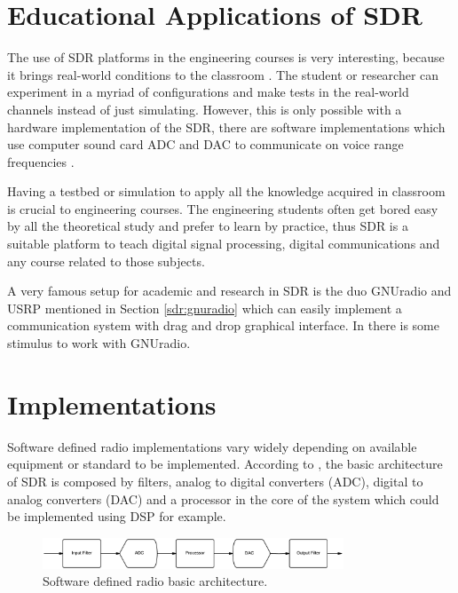 \section{Educational Applications of SDR}

The use of SDR platforms in the engineering courses is very interesting, because
it brings real-world conditions to the classroom \cite{ladimer2009}. The student
or researcher can experiment in a myriad of configurations and make tests in the
real-world channels instead of just simulating. However, this is only possible
with a hardware implementation of the SDR, there are software implementations
which use computer sound card ADC and DAC to communicate on voice range
frequencies \cite{ladimer2009}.

Having a testbed or simulation to apply all the knowledge acquired in classroom
is crucial to engineering courses. The engineering students often get bored easy
by all the theoretical study and prefer to learn by practice, thus SDR is a
suitable platform to teach digital signal processing, digital communications and
any course related to those subjects.

A very famous setup for academic and research in SDR is the duo GNUradio
\cite{web:gnuradio} and USRP \cite{web:usrp} mentioned in Section
\ref{sdr:gnuradio} which can easily implement a communication system with drag
and drop graphical interface. In \cite{akbook} there is some stimulus to work
with GNUradio.


\section{Implementations}
\label{sdr:implement}

Software defined radio implementations vary widely depending on available
equipment or standard to be implemented. According to \cite{ladimer2009}, the basic
architecture of SDR is composed by filters, analog to digital converters (ADC),
digital to analog converters (DAC) and a processor in the core of the system
which could be implemented using DSP for example.

\begin{figure}[htbp]
    \centering
    \includegraphics[width=0.8\textwidth]{./figures/sdr_basic_arch}
    \caption{ Software defined radio basic architecture.
    \label{fig:sdr_basic}}
\end{figure}



